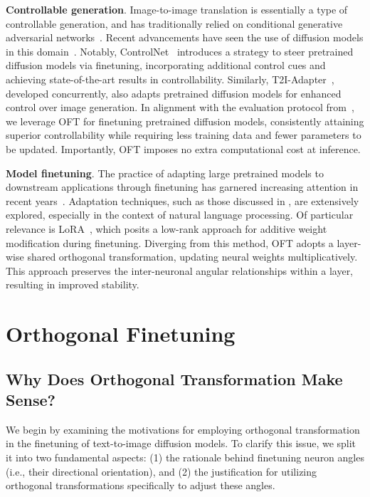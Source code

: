 \textbf{Controllable generation}. Image-to-image translation is essentially a type of controllable generation, and has traditionally relied on conditional generative adversarial networks~\cite{isola2017image,zhu2017toward,wang2018high,park2019semantic,choi2018stargan}. Recent advancements have seen the use of diffusion models in this domain~\cite{saharia2022palette,voynov2022sketch,wang2022pretraining}. Notably, ControlNet~\cite{zhang2023adding} introduces a strategy to steer pretrained diffusion models via finetuning, incorporating additional control cues and achieving state-of-the-art results in controllability. Similarly, T2I-Adapter~\cite{mou2023t2i}, developed concurrently, also adapts pretrained diffusion models for enhanced control over image generation. In alignment with the evaluation protocol from~\cite{zhang2023adding,mou2023t2i}, we leverage OFT for finetuning pretrained diffusion models, consistently attaining superior controllability while requiring less training data and fewer parameters to be updated. Importantly, OFT imposes no extra computational cost at inference.

\textbf{Model finetuning}. The practice of adapting large pretrained models to downstream applications through finetuning has garnered increasing attention in recent years~\cite{devlin2018bert,brown2020language,he2022masked}. Adaptation techniques, such as those discussed in \cite{hulora2022,houlsby2019parameter,pfeiffer2020adapterfusion}, are extensively explored, especially in the context of natural language processing. Of particular relevance is LoRA~\cite{hulora2022}, which posits a low-rank approach for additive weight modification during finetuning. Diverging from this method, OFT adopts a layer-wise shared orthogonal transformation, updating neural weights multiplicatively. This approach preserves the inter-neuronal angular relationships within a layer, resulting in improved stability.

\section{Orthogonal Finetuning}

\subsection{Why Does Orthogonal Transformation Make Sense?}

We begin by examining the motivations for employing orthogonal transformation in the finetuning of text-to-image diffusion models. To clarify this issue, we split it into two fundamental aspects: (1) the rationale behind finetuning neuron angles (i.e., their directional orientation), and (2) the justification for utilizing orthogonal transformations specifically to adjust these angles.

